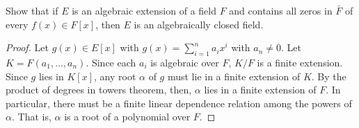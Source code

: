\documentclass{article}
\begin{document}
 Show that if $E$ is an algebraic extension of a field $F$ and contains all zeros in $\bar{F}$ of every $f(x) \in F[x]$, then $E$ is an algebraically closed field.
\begin{proof}
Let $g(x) \in E[x]$ with $g(x) = \sum_{i=1}^n a_i x^i$ with $a_n \ne 0$. Let $K = F(a_1, \ldots, a_n)$.  Since each $a_i$ is algebraic over $F$, $K/F$ is a finite extension. Since $g$ lies in $K[x]$, any root $\alpha$ of $g$ must lie in a finite extension of $K$. By the product of degrees in towers theorem, then, $\alpha$ lies in a finite extension of $F$. In particular, there must be a finite linear dependence relation among the powers of $\alpha$. That is, $\alpha$ is a root of a polynomial over $F$.
\end{proof}
\end{document}

